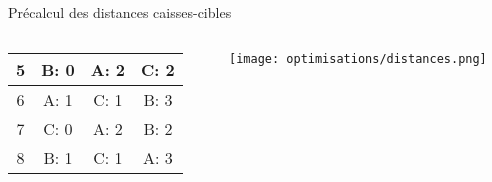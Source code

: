 \begin{frame}{Précalcul des distances caisses-cibles}
\begin{columns}[onlytextwidth]
{\begin{column}{0.49\textwidth}
\begin{tabular}{|c|c|c|c|}
                            5 & B: 0 & A: 2 & C: 2 \\ \hline
                            6 & A: 1 & C: 1 & B: 3 \\ \hline
                            7 & C: 0 & A: 2 & B: 2 \\ \hline
                            8 & B: 1 & C: 1 & A: 3 \\ \hline
                        \end{tabular}
                    \end{column}
                }
                \begin{column}{0.5\textwidth}
                    \texttt{[image: optimisations/distances.png]}
                \end{column}

            \end{columns}
        \end{frame}

        

